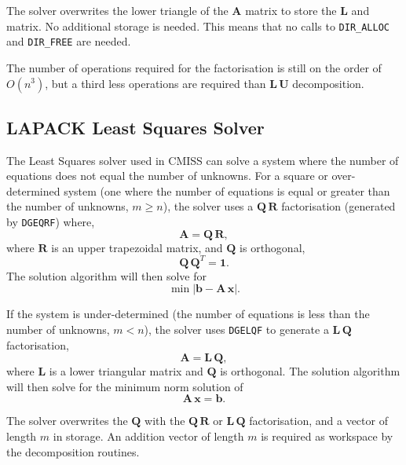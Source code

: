 The solver overwrites the lower triangle of the $\mathbf{A}$ matrix to store 
the $\mathbf{L}$ and matrix. No additional storage is needed. This means that
no calls to {\tt DIR\_ALLOC} and {\tt DIR\_FREE} are needed.

The number of operations required for the factorisation is still on the order 
of $O(n^3)$, but a third less operations are required than $\mathbf{L \, U}$
decomposition.


\subsection{LAPACK Least Squares Solver}\label{s2.3}

The Least Squares solver used in CMISS can solve a system where the number
of equations does not equal the number of unknowns. For a square or
over-determined system (one where the number of equations is equal or greater
than the number of unknowns, $m \ge n$), the solver uses a $\mathbf{Q \, R}$ 
factorisation (generated by {\tt DGEQRF}) where,
\begin{equation}\label{e2.3.1}
\mathbf{A} = \mathbf{Q} \, \mathbf{R},
\end{equation}
where $\mathbf{R}$ is an upper trapezoidal matrix, and $\mathbf{Q}$ is
orthogonal,
\begin{equation}\label{e2.3.2}
\mathbf{Q} \, \mathbf{Q}^T = \mathbf{1}.
\end{equation}
The solution algorithm will then solve for
\begin{equation}\label{e2.3.3}
\min \left| \mathbf{b} - \mathbf{A} \, \mathbf{x} \right|.
\end{equation}

If the system is under-determined (the number of equations is less than the 
number of unknowns, $m < n$), the solver uses {\tt DGELQF} to generate a
$\mathbf{L \, Q}$ factorisation,
\begin{equation}\label{e2.3.4}
\mathbf{A} = \mathbf{L} \, \mathbf{Q},
\end{equation}
where $\mathbf{L}$ is a lower triangular matrix and $\mathbf{Q}$ is
orthogonal. The solution algorithm will then solve for the minimum norm 
solution of 
\begin{equation}\label{e2.3.5}
\mathbf{A \, x} = \mathbf{b}.
\end{equation}

The solver overwrites the $\mathbf{Q}$ with the $\mathbf{Q \, R}$ or 
$\mathbf{L \, Q}$ factorisation, and a vector of length $m$ in storage. 
An addition vector of length $m$ is required as workspace by the decomposition
routines.


